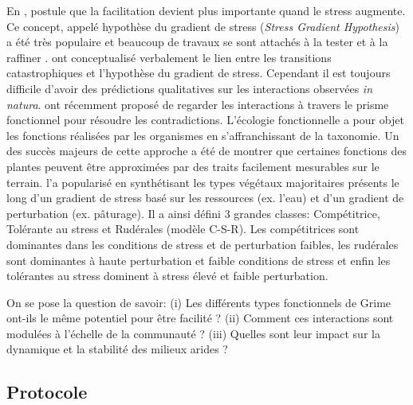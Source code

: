 \documentclass[12pt]{article} %
\begin{document}
En \citeyear{Bertness1994}, \citeauthor{Bertness1994} postule que la facilitation devient plus importante quand le stress augmente. Ce concept, appelé hypothèse du gradient de stress (\textit{Stress Gradient Hypothesis}) a été très populaire et beaucoup de travaux se sont attachés à la tester et à la raffiner \citep{ Michalet2007,Maestre2009,He2013}. \citet{Verwijmeren2013} ont conceptualisé verbalement le lien entre les transitions catastrophiques et l'hypothèse du gradient de stress. Cependant il est toujours difficile d'avoir des prédictions qualitatives sur les interactions observées \textit{in natura}. \citet{Butterfield2013} ont récemment proposé de regarder les interactions à travers le prisme fonctionnel pour résoudre les contradictions. L'écologie fonctionnelle a pour objet les fonctions réalisées par les organismes en s'affranchissant de la taxonomie. Un des succès majeurs de cette approche a été de montrer que certaines fonctions des plantes peuvent être approximées par des traits facilement mesurables sur le terrain. \citet{Grime1977a} l'a popularisé en synthétisant les types végétaux majoritaires présents le long d'un gradient de stress basé sur les ressources (ex. l'eau) et d'un gradient de perturbation (ex. pâturage). Il a ainsi défini 3 grandes classes: Compétitrice, Tolérante au stress et Rudérales (modèle C-S-R). Les compétitrices sont dominantes dans les conditions de stress et de perturbation faibles, les rudérales sont dominantes à haute perturbation et faible conditions de stress et enfin les tolérantes au stress dominent à stress élevé et faible perturbation.

On se pose la question de savoir: (i) Les différents types fonctionnels de Grime ont-ils le même potentiel pour être facilité ? (ii) Comment ces interactions sont modulées à l'échelle de la communauté ? (iii) Quelles sont leur impact sur la dynamique et la stabilité des milieux arides ?

\subsection{Protocole}
\end{document}
